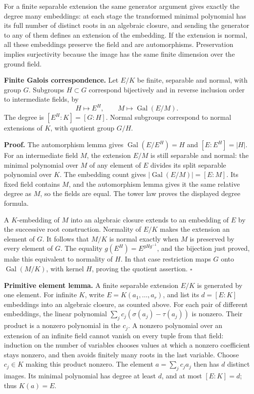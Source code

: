 \documentclass[11pt,a4paper]{article}
\begin{document}
For a finite separable extension the same generator argument gives
exactly the degree many embeddings: at each stage the transformed
minimal polynomial has its full number of distinct roots in an algebraic
closure, and sending the generator to any of them defines an extension
of the embedding. If the extension is normal, all these embeddings
preserve the field and are automorphisms. Preservation implies
surjectivity because the image has the same finite dimension over the
ground field.

\textbf{Finite Galois correspondence.} Let \(E/K\) be finite, separable
and normal, with group \(G\). Subgroups \(H\subset G\) correspond
bijectively and in reverse inclusion order to intermediate fields, by \[
H\longmapsto E^H,\qquad M\longmapsto\operatorname{Gal}(E/M).
\] The degree is \([E^H:K]=[G:H]\). Normal subgroups correspond to
normal extensions of \(K\), with quotient group \(G/H\).

\textbf{Proof.} The automorphism lemma gives
\(\operatorname{Gal}(E/E^H)=H\) and \([E:E^H]=|H|\). For an intermediate
field \(M\), the extension \(E/M\) is still separable and normal: the
minimal polynomial over \(M\) of any element of \(E\) divides its split
separable polynomial over \(K\). The embedding count gives
\(|\operatorname{Gal}(E/M)|=[E:M]\). Its fixed field contains \(M\), and
the automorphism lemma gives it the same relative degree as \(M\), so
the fields are equal. The tower law proves the displayed degree formula.

A \(K\)-embedding of \(M\) into an algebraic closure extends to an
embedding of \(E\) by the successive root construction. Normality of
\(E/K\) makes the extension an element of \(G\). It follows that \(M/K\)
is normal exactly when \(M\) is preserved by every element of \(G\). The
equality \(g(E^H)=E^{gHg^{-1}}\), and the bijection just proved, make
this equivalent to normality of \(H\). In that case restriction maps
\(G\) onto \(\operatorname{Gal}(M/K)\), with kernel \(H\), proving the
quotient assertion. \(\square\)

\textbf{Primitive element lemma.} A finite separable extension \(E/K\)
is generated by one element. For infinite \(K\), write
\(E=K(a_1,\ldots,a_r)\), and list its \(d=[E:K]\) embeddings into an
algebraic closure, as counted above. For each pair of different
embeddings, the linear polynomial \(\sum_j c_j(\sigma(a_j)-\tau(a_j))\)
is nonzero. Their product is a nonzero polynomial in the \(c_j\). A
nonzero polynomial over an extension of an infinite field cannot vanish
on every tuple from that field: induction on the number of variables
chooses values at which a nonzero coefficient stays nonzero, and then
avoids finitely many roots in the last variable. Choose \(c_j\in K\)
making this product nonzero. The element \(a=\sum_j c_ja_j\) then has
\(d\) distinct images. Its minimal polynomial has degree at least \(d\),
and at most \([E:K]=d\); thus \(K(a)=E\).
\end{document}
